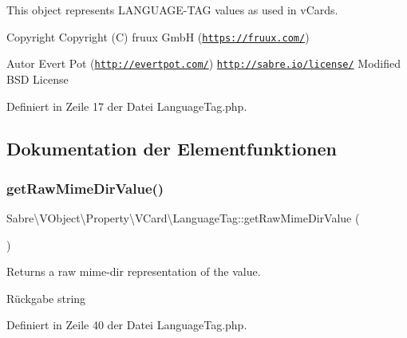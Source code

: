 This object represents L\+A\+N\+G\+U\+A\+G\+E-\/\+T\+AG values as used in v\+Cards.

\begin{DoxyCopyright}{Copyright}
Copyright (C) fruux GmbH (\href{https://fruux.com/}{\tt https\+://fruux.\+com/}) 
\end{DoxyCopyright}
\begin{DoxyAuthor}{Autor}
Evert Pot (\href{http://evertpot.com/}{\tt http\+://evertpot.\+com/})  \href{http://sabre.io/license/}{\tt http\+://sabre.\+io/license/} Modified B\+SD License 
\end{DoxyAuthor}


Definiert in Zeile 17 der Datei Language\+Tag.\+php.



\subsection{Dokumentation der Elementfunktionen}
\mbox{\label{class_sabre_1_1_v_object_1_1_property_1_1_v_card_1_1_language_tag_abf5005a602e971d95d0985ae9e5c6e23}} 
\subsubsection{\texorpdfstring{get\+Raw\+Mime\+Dir\+Value()}{getRawMimeDirValue()}}
{\footnotesize\ttfamily Sabre\textbackslash{}\+V\+Object\textbackslash{}\+Property\textbackslash{}\+V\+Card\textbackslash{}\+Language\+Tag\+::get\+Raw\+Mime\+Dir\+Value (\begin{DoxyParamCaption}{ }\end{DoxyParamCaption})}

Returns a raw mime-\/dir representation of the value.

\begin{DoxyReturn}{Rückgabe}
string 
\end{DoxyReturn}


Definiert in Zeile 40 der Datei Language\+Tag.\+php.

\mbox{\label{class_sabre_1_1_v_object_1_1_property_1_1_v_card_1_1_language_tag_a82e4beb4abb07a50b84fb8bba476d478}} 

